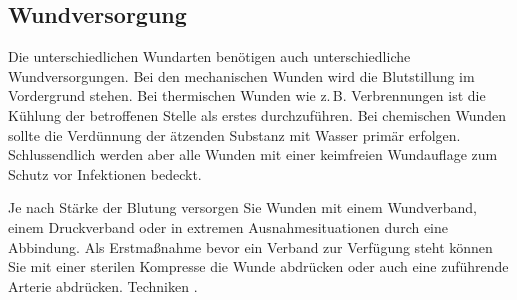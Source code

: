 \subsection{Wundversorgung}

Die unterschiedlichen Wundarten benötigen auch unterschiedliche Wundversorgungen.
Bei den mechanischen Wunden wird die Blutstillung im Vordergrund stehen. Bei
thermischen Wunden wie z.\,B. Verbrennungen ist die Kühlung der betroffenen Stelle
als erstes durchzuführen. Bei chemischen Wunden sollte die Verdünnung der
ätzenden Substanz mit Wasser primär erfolgen. Schlussendlich werden aber alle
Wunden mit einer keimfreien Wundauflage zum Schutz vor Infektionen bedeckt.

Je nach Stärke der Blutung versorgen Sie Wunden mit einem Wundverband, einem
Druckverband oder in extremen Ausnahmesituationen durch eine Abbindung. Als
Erstmaßnahme bevor ein Verband zur Verfügung steht können Sie mit einer sterilen
Kompresse die Wunde abdrücken oder auch eine zuführende Arterie abdrücken.
Techniken . 


